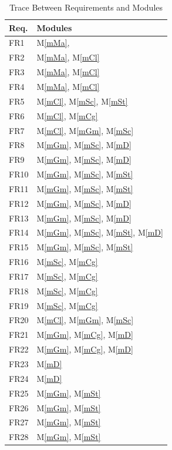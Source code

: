 \documentclass[12pt, titlepage]{article}
\newcommand{\mref}[1]{M\ref{#1}}
\begin{document}
\begin{table}[!htbp]
\centering
\begin{tabular}{p{} p{}}
\toprule
\textbf{Req.} & \textbf{Modules}\\
\midrule
FR1 & \mref{mMa}, \\
FR2 & \mref{mMa}, \mref{mCl}\\
FR3 & \mref{mMa}, \mref{mCl}\\
FR4 & \mref{mMa}, \mref{mCl}\\
FR5 & \mref{mCl}, \mref{mSc}, \mref{mSt}\\
FR6 & \mref{mCl}, \mref{mCg}\\
FR7 & \mref{mCl}, \mref{mGm}, \mref{mSc}\\
FR8 & \mref{mGm}, \mref{mSc}, \mref{mD}\\
FR9 & \mref{mGm}, \mref{mSc}, \mref{mD}\\
FR10 & \mref{mGm}, \mref{mSc}, \mref{mSt}\\
FR11 & \mref{mGm}, \mref{mSc}, \mref{mSt}\\
FR12 & \mref{mGm}, \mref{mSc}, \mref{mD}\\
FR13 & \mref{mGm}, \mref{mSc}, \mref{mD}\\
FR14 & \mref{mGm}, \mref{mSc}, \mref{mSt}, \mref{mD}\\
FR15 & \mref{mGm}, \mref{mSc}, \mref{mSt}\\
FR16 & \mref{mSc}, \mref{mCg}\\
FR17 & \mref{mSc}, \mref{mCg}\\
FR18 & \mref{mSc}, \mref{mCg}\\
FR19 & \mref{mSc}, \mref{mCg}\\
FR20 & \mref{mCl}, \mref{mGm}, \mref{mSc}\\
FR21 & \mref{mGm}, \mref{mCg}, \mref{mD}\\
FR22 & \mref{mGm}, \mref{mCg}, \mref{mD}\\
FR23 & \mref{mD}\\
FR24 & \mref{mD}\\
FR25 & \mref{mGm}, \mref{mSt}\\
FR26 & \mref{mGm}, \mref{mSt}\\
FR27 & \mref{mGm}, \mref{mSt}\\
FR28 & \mref{mGm}, \mref{mSt}\\
\bottomrule
\end{tabular}
\caption{Trace Between Requirements and Modules}
\label{TblRT}
\end{table}
\end{document}
